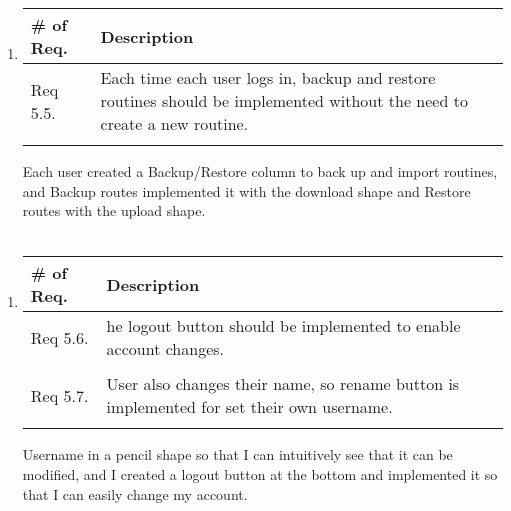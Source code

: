 \begin{enumerate}[label=\arabic*.]
          \begin{enumerate}[label*={\arabic*.},ref=\theenumi.\arabic*]
              \setlength{\itemindent}{0.5cm}
              \item
                    \begin{table}[H]
                        \center
                        \begin{tabular}{m{1.4cm} m{5.5cm}}
                            \toprule
                            \# of Req. & Description                                                                                                              \\
                            \midrule
                            Req 5.5.   & Each time each user logs in, backup and restore routines should be implemented without the need to create a new routine. \\\\
                            \bottomrule
                        \end{tabular}
                    \end{table}

                    Each user created a Backup/Restore column to back up and import routines, and Backup routes implemented it with the download shape and Restore routes with the upload shape.\\\\
          \end{enumerate}


          \begin{enumerate}[label*={\arabic*.},ref=\theenumi.\arabic*]
              \setlength{\itemindent}{0.5cm}
              \item
                    \begin{table}[H]
                        \center
                        \begin{tabular}{m{1.4cm} m{5.5cm}}
                            \toprule
                            \# of Req. & Description                                                                               \\
                            \midrule
                            Req 5.6.   & he logout button should be implemented to enable account changes.                         \\\\
                            Req 5.7.   & User also changes their name, so rename button is implemented for set their own username. \\\\
                            \bottomrule
                        \end{tabular}
                    \end{table}

                    Username in a pencil shape so that I can intuitively see that it can be modified, and I created a logout button at the bottom and implemented it so that I can easily change my account.\\\\

          \end{enumerate}
\end{enumerate}
